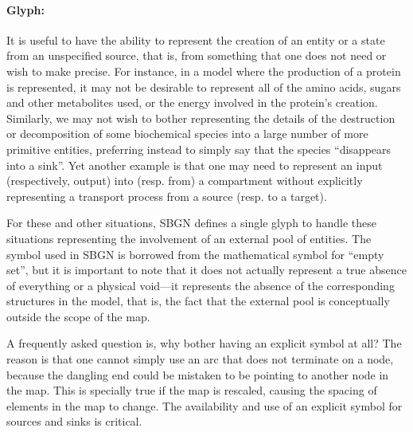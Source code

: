 \paragraph{Glyph: }
\label{sec:sourceSink}

It is useful to have the ability to represent the creation of an entity or
a state from an unspecified source, that is, from something that one does
not need or wish to make precise.  For instance, in a model where the
production of a protein is represented, it may not be desirable to
represent all of the amino acids, sugars and other metabolites used, or the
energy involved in the protein's creation.  Similarly, we may not wish to
bother representing the details of the destruction or decomposition of some
biochemical species into a large number of more primitive entities,
preferring instead to simply say that the species ``disappears into a
sink''.  Yet another example is that one may need to represent an input
(respectively, output) into (resp. from) a compartment without explicitly
representing a transport process from a source (resp. to a target).

For these and other situations, SBGN defines a single glyph to handle
these situations representing the involvement of an external pool of entities.  The symbol
used in SBGN is borrowed from the mathematical symbol for ``empty set'',
but it is important to note that it does not actually represent a true
absence of everything or a physical void---it represents the absence of the
corresponding structures in the model, that is, the fact that the
external pool is conceptually outside the scope of the map.

A frequently asked question is, why bother having an explicit symbol at
all?  The reason is that one cannot simply use an arc that does not
terminate on a node, because the dangling end could be mistaken to be
pointing to another node in the map.  This is specially true if the
map is rescaled, causing the spacing of elements in the map to
change.  The availability and use of an explicit symbol for sources and
sinks is critical.

